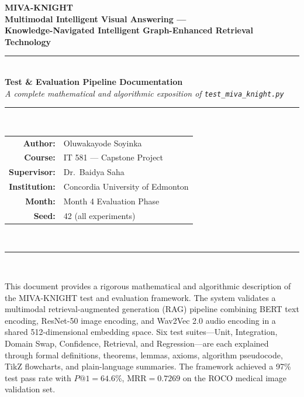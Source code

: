 \documentclass[12pt,a4paper]{article}
\begin{document}
\begin{titlepage}
  \centering
  \vspace*{2cm}
  {\Huge\bfseries\color{accentblue} MIVA-KNIGHT}\\[0.5em]
  {\Large\bfseries Multimodal Intelligent Visual Answering ---\\
  Knowledge-Navigated Intelligent Graph-Enhanced Retrieval Technology}\\[1.5em]
  \rule{\textwidth}{1pt}\\[1em]
  {\Large\bfseries Test \& Evaluation Pipeline Documentation}\\[0.5em]
  {\large\itshape A complete mathematical and algorithmic exposition of \texttt{test\_miva\_knight.py}}\\[2em]
  \rule{\textwidth}{0.5pt}\\[1.5em]
  \begin{tabular}{rl}
    \textbf{Author:}     & Oluwakayode Soyinka \\[0.4em]
    \textbf{Course:}     & IT 581 --- Capstone Project \\[0.4em]
    \textbf{Supervisor:} & Dr.\ Baidya Saha \\[0.4em]
    \textbf{Institution:}& Concordia University of Edmonton \\[0.4em]
    \textbf{Month:}      & Month 4 Evaluation Phase \\[0.4em]
    \textbf{Seed:}       & 42 (all experiments) \\
  \end{tabular}\\[2em]
  \rule{\textwidth}{0.5pt}\\[1em]
  \begin{tcolorbox}[
    colback=lightbluebox!30, colframe=accentblue, width=0.88\textwidth,
    title=\textbf{Abstract}, fonttitle=\bfseries
  ]
  This document provides a rigorous mathematical and algorithmic description of the
  MIVA-KNIGHT test and evaluation framework. The system validates a multimodal
  retrieval-augmented generation (RAG) pipeline combining BERT text encoding,
  ResNet-50 image encoding, and Wav2Vec 2.0 audio encoding in a shared 512-dimensional
  embedding space. Six test suites---Unit, Integration, Domain Swap, Confidence,
  Retrieval, and Regression---are each explained through formal definitions, theorems,
  lemmas, axioms, algorithm pseudocode, TikZ flowcharts, and plain-language summaries.
  The framework achieved a 97\% test pass rate with $P@1 = 64.6\%$, $\text{MRR} = 0.7269$
  on the ROCO medical image validation set.
  \end{tcolorbox}
\end{titlepage}
\end{document}
